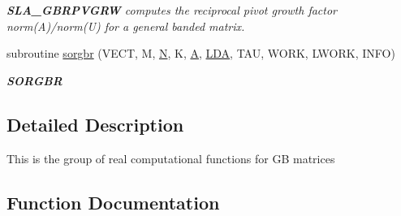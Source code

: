 \begin{DoxyCompactItemize}
\begin{DoxyCompactList}\small\item\em {\bfseries S\+L\+A\+\_\+\+G\+B\+R\+P\+V\+G\+R\+W} computes the reciprocal pivot growth factor norm(\+A)/norm(U) for a general banded matrix. \end{DoxyCompactList}\item 
subroutine \hyperlink{group__realGBcomputational_ga2afc11d15eaf27524838268032c62b94}{sorgbr} (V\+E\+C\+T, M, \hyperlink{polmisc_8c_a0240ac851181b84ac374872dc5434ee4}{N}, K, \hyperlink{classA}{A}, \hyperlink{example__user_8c_ae946da542ce0db94dced19b2ecefd1aa}{L\+D\+A}, T\+A\+U, W\+O\+R\+K, L\+W\+O\+R\+K, I\+N\+F\+O)
\begin{DoxyCompactList}\small\item\em {\bfseries S\+O\+R\+G\+B\+R} \end{DoxyCompactList}\end{DoxyCompactItemize}


\subsection{Detailed Description}
This is the group of real computational functions for G\+B matrices 

\subsection{Function Documentation}
\hypertarget{group__realGBcomputational_ga1929cafd58d8fe59c200282e4497da0a}{}

